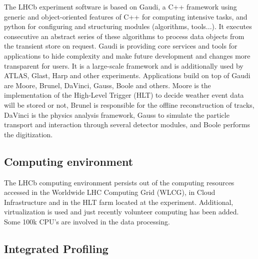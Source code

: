 \documentclass[a4paper]{jpconf}
\begin{document}
The LHCb experiment software is based on Gaudi\cite{gaudi}, a C++ framework using generic and object-oriented features of C++ for computing intensive tasks, and python for configuring and structuring modules (algorithms, tools...). It executes consecutive an abstract series of these algorithms to process data objects from the transient store on request. Gaudi is providing core services and tools for applications to hide complexity and make future development and changes more transparent for users. It is a large-scale framework and is additionally used by ATLAS, Glast, Harp and other experiments.
\newline
Applications build on top of Gaudi are Moore, Brunel, DaVinci, Gauss, Boole and others. Moore is the implementation of the High-Level Trigger (HLT) to decide weather event data will be stored or not, Brunel is responsible for the offline reconstruction of tracks, DaVinci is the physics analysis framework, Gauss to simulate the particle transport and interaction through several detector modules, and Boole performs the digitization.

\subsection{Computing environment}
\label{sec:computing_environment}

The LHCb computing environment persists out of the computing resources accessed in the Worldwide LHC Computing Grid (WLCG), in Cloud Infrastructure and in the HLT farm located at the experiment. Additional, virtualization is used and just recently volunteer computing has been added. Some 100k CPU's are involved in the data processing. 

\subsection{Integrated Profiling}
\label{sec:integrated_profiling}
\end{document}
